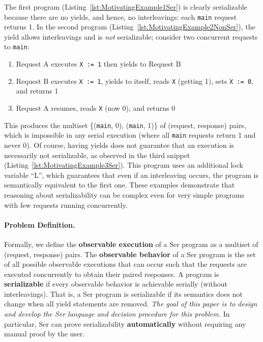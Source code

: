 %
The first program (Listing~\ref{lst:MotivatingExample1Ser}) is clearly serializable because there are no yields, and hence, no interleavings: each \texttt{main} request returns 1.
In the second program (Listing~\ref{lst:MotivatingExample2NonSer}), the yield allows interleavings and is \emph{not} serializable; consider two concurrent requests to \texttt{main}:
\begin{enumerate}
\item Request A executes \texttt{X := 1} then yields to Request B
\item Request B executes \texttt{X := 1}, yields to itself, reads \texttt{X} (getting 1), sets \texttt{X := 0}, and returns 1
\item Request A resumes, reads \texttt{X} (now 0), and returns 0
\end{enumerate}
This produces the multiset \{(\texttt{main}, 0), (\texttt{main}, 1)\} of (request, response) pairs, which is impossible in any serial execution (where all \texttt{main} requests return 1 and never 0).
Of course, having yields does not guarantee that an execution is necessarily not serializable, as observed in the third snippet (Listing~\ref{lst:MotivatingExample3Ser}). This program uses an additional lock variable ``L'', which guarantees that even if an interleaving occurs, the program is semantically equivalent to the first one.
%
These examples demonstrate that reasoning about serializability can be complex even for very simple programs with few requests running concurrently.
\vspace{-.5em}
\paragraph{Problem Definition.}
Formally, we define the \textbf{observable execution} of a Ser program as a multiset of (request, response) pairs. The \textbf{observable behavior} of a Ser program is the set of all possible observable executions that can occur such that the requests are executed concurrently to obtain their paired responses.
A program is \textbf{serializable} if every observable behavior is achievable serially (without interleavings). That is, a Ser program is serializable if its semantics does not change when all yield statements are removed.
%
\emph{The goal of this paper is to design and develop the Ser language and decision procedure for this problem.} In particular, Ser can prove serializability \textbf{automatically} without requiring any manual proof by the user.
\vspace{-.5em}
